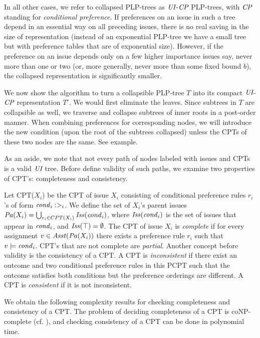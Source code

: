 In all other cases, we refer to collapsed PLP-trees as $\textit{UI}$-$\textit{CP}$ PLP-trees, 
with $\textit{CP}$ standing for \emph{conditional preference}. If preferences on 
an issue in such a tree depend in an essential way on all preceding 
issues, there is no real saving in the size of representation (instead 
of an exponential PLP-tree we have a small tree but with preference 
tables that are of exponential size). However, if the preference on an 
issue depends only on a few higher importance issues say, never more than 
one or two (or, more generally, never more than some fixed bound $b$), 
the collapsed representation is significantly smaller.

We now show the algorithm to turn a collapsible PLP-tree $T$
into its compact $\textit{UI}$-$\textit{CP}$ representation $T'$.
We would first eliminate the leaves. 
Since subtrees in $T$ are collapsible as well, we traverse and collapse 
subtrees of inner roots in a post-order manner.
When combining preferences for corresponding nodes,
we will introduce the new condition (upon the root of the subtrees collapsed)
unless the CPTs of these two nodes are the same.
See example.

As an aside, we note that not every path of nodes labeled with issues
and CPTs is a valid $\textit{UI}$ tree.
Before define validity of such paths, we examine two properties of CPT's:
completeness and consistency.

Let CPT($X_i$) be the CPT of issue $X_i$ consisting of conditional preference
rules $r_i$'s of form $\mathit{cond}_i: >_i$.  We define the set of $X_i$'s parent issues
$\mathit{Pa}(X_i)=\bigcup_{r_i \in CPT(X_i)} \mathit{Iss}(\mathit{cond}_i)$,
where $\mathit{Iss}(\mathit{cond}_i)$ is the set of issues that appear in $\mathit{cond}_i$,
and $\mathit{Iss}(\top)=\emptyset$.
The CPT of issue $X_i$ is \emph{complete} if for every
assignment $v \in \mathit{Asst}(\mathit{Pa}(X_i))$ there exists a preference rule $r_i$
such that $v \models \mathit{cond}_i$.
CPT's that are not complete are \emph{partial}.
Another concept before validity is the
consistency of a CPT. 
A CPT is \emph{inconsistent} if there exist an outcome
and two conditional preference rules in this PCPT such that the outcome satisfies
both conditions but the preference orderings are different.
A CPT is \emph{consistent} if it is not inconsistent.

We obtain the following complexity results for checking completeness and consistency
of a CPT.
The problem of deciding completeness of a CPT is coNP-complete (cf. ), and
checking consistency of a CPT can be done in polynomial time.

